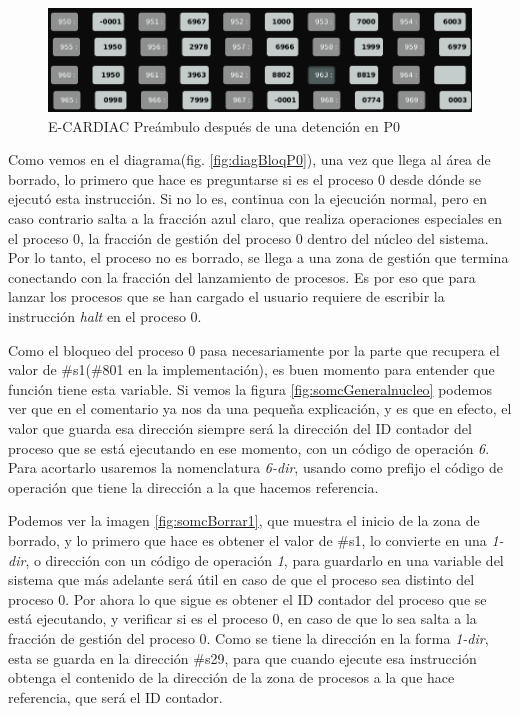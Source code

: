 \documentclass[letterpaper,12pt,oneside]{book}
\begin{document}
		
		\begin{figure}[h]		
			\centering
			\includegraphics[scale=0.4]{media/CARDIACC/eccPreambuloHaltOpP0.png}
			\caption{ E-CARDIAC Preámbulo después de una detención en P0}
			\label{fig:eccPreamHaltP0}
		\end{figure}
		
		Como vemos en el diagrama(fig. \ref{fig:diagBloqP0}), una vez que llega al área de borrado, lo primero que hace es preguntarse si es el proceso
		0 desde dónde se ejecutó esta instrucción. Si no lo es, continua con la ejecución normal, pero en caso contrario salta a la fracción azul claro,
		que realiza operaciones especiales en el proceso 0, la fracción de gestión del proceso 0 dentro del núcleo del sistema. Por lo tanto, el proceso no es borrado, se llega a una zona de gestión que termina conectando con la fracción del lanzamiento de procesos. Es por eso que para lanzar los procesos que se han cargado el usuario requiere de escribir la instrucción \textit{halt} en el proceso 0.

        
        Como
		el bloqueo del proceso 0 pasa necesariamente por la parte que recupera el valor de \#s1(\#801 en la implementación), es buen momento para entender
		que función tiene esta variable. Si vemos la figura \ref{fig:somcGeneralnucleo} podemos
		ver que en el comentario ya nos da una pequeña explicación, y es que en efecto, el valor que guarda esa dirección siempre será la dirección
		del ID contador del proceso que se está ejecutando en ese momento, con un código de operación \textit{6}. Para acortarlo usaremos la nomenclatura
		\textit{6-dir}, usando como prefijo el código de operación que tiene la dirección a la que hacemos referencia.
  
        Podemos ver la
		imagen \ref{fig:somcBorrar1}, que muestra el inicio de la zona de borrado, y lo primero que hace es obtener el valor de \#s1, lo convierte
		en una \textit{1-dir}, o dirección con un código de operación \textit{1}, para guardarlo en una variable del sistema que más adelante será útil en caso
		de que el proceso sea distinto del proceso 0. Por ahora lo que sigue es obtener el ID contador del proceso que se está ejecutando, y verificar si es el proceso
		0, en caso de que lo sea salta a la fracción de gestión del proceso 0. Como se tiene la dirección en la forma \textit{1-dir}, esta se guarda en la dirección \#s29, para
        que cuando ejecute esa instrucción obtenga el contenido de la dirección de la zona de procesos a la que hace referencia, que será el ID contador.
  
\end{document}
